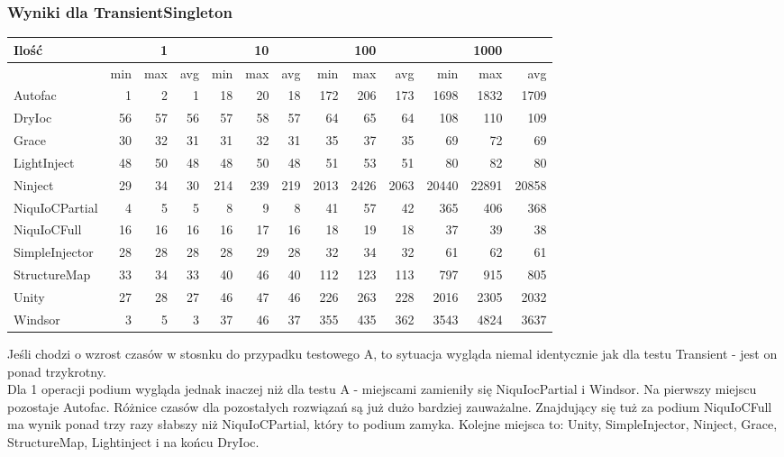 \documentclass[12pt]{article}
\begin{document}
\subsubsection{Wyniki dla TransientSingleton}
\begin{center}
\begin{small}
	\begin{tabular}{ | l | r r r | r r r | r r r | r r r | }
    		\hline
Ilość & & 1 & & & 10 & & & 100 & & & 1000 & \\ \hline
 & min & max & avg & min & max & avg & min & max & avg & min & max & avg \\ \hline
Autofac & 1 & 2 & 1 & 18 & 20 & 18 & 172 & 206 & 173 & 1698 & 1832 & 1709 \\ \hline
DryIoc & 56 & 57 & 56 & 57 & 58 & 57 & 64 & 65 & 64 & 108 & 110 & 109 \\ \hline
Grace & 30 & 32 & 31 & 31 & 32 & 31 & 35 & 37 & 35 & 69 & 72 & 69 \\ \hline
LightInject & 48 & 50 & 48 & 48 & 50 & 48 & 51 & 53 & 51 & 80 & 82 & 80 \\ \hline
Ninject & 29 & 34 & 30 & 214 & 239 & 219 & 2013 & 2426 & 2063 & 20440 & 22891 & 20858 \\ \hline
NiquIoCPartial & 4 & 5 & 5 & 8 & 9 & 8 & 41 & 57 & 42 & 365 & 406 & 368 \\ \hline
NiquIoCFull & 16 & 16 & 16 & 16 & 17 & 16 & 18 & 19 & 18 & 37 & 39 & 38 \\ \hline
SimpleInjector & 28 & 28 & 28 & 28 & 29 & 28 & 32 & 34 & 32 & 61 & 62 & 61 \\ \hline
StructureMap & 33 & 34 & 33 & 40 & 46 & 40 & 112 & 123 & 113 & 797 & 915 & 805 \\ \hline
Unity & 27 & 28 & 27 & 46 & 47 & 46 & 226 & 263 & 228 & 2016 & 2305 & 2032 \\ \hline
Windsor & 3 & 5 & 3 & 37 & 46 & 37 & 355 & 435 & 362 & 3543 & 4824 & 3637 \\ \hline
  	\end{tabular}
\end{small}
\end{center}
Jeśli chodzi o wzrost czasów w stosnku do przypadku testowego A, to sytuacja wygląda niemal identycznie jak dla testu Transient - jest on ponad trzykrotny.\\
Dla 1 operacji podium wygląda jednak inaczej niż dla testu A - miejscami zamieniły się NiquIocPartial i Windsor. Na pierwszy miejscu pozostaje Autofac. Różnice czasów dla pozostałych rozwiązań są już dużo bardziej zauważalne. Znajdujący się tuż za podium NiquIoCFull ma wynik ponad trzy razy słabszy niż NiquIoCPartial, który to podium zamyka. Kolejne miejsca to: Unity, SimpleInjector, Ninject, Grace, StructureMap, Lightinject i na końcu DryIoc.\\
\end{document}
